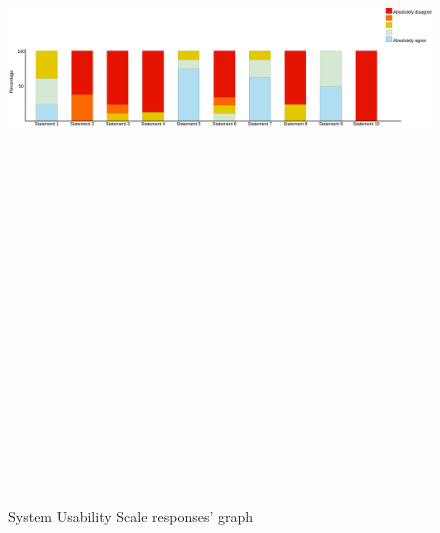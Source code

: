 \begin{figure}[h!]
  \centering
  \includegraphics[angle=90, height=23cm,keepaspectratio]{./img/SUS.png}
  \caption{System Usability Scale responses' graph}
  \label{susgraph}
\end{figure}

